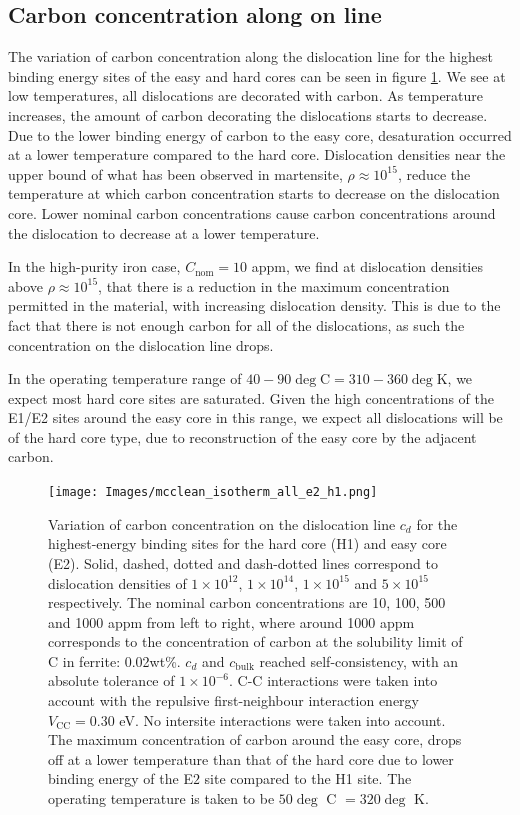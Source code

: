 \documentclass[a4paper,12pt,oneside,print,numbered,index,PageStyleIII]{PhDThesisPSnPDF}
\begin{document}
\subsection{Carbon concentration along on line}
\label{sec:org43adba5}

The variation of carbon concentration along the dislocation line for the highest
binding energy sites of the easy and hard cores can be seen in figure
\ref{cdhardeasy}. We see at low temperatures, all dislocations are
decorated with carbon. As temperature increases, the amount of carbon
decorating the dislocations starts to decrease. Due to the lower binding
energy of carbon to the easy core, desaturation occurred at a lower
temperature compared to the hard core. Dislocation densities near the upper
bound of what has been observed in martensite, \(\rho \approx10^{15}\), reduce
the temperature at which carbon concentration starts to decrease on the
dislocation core. Lower nominal carbon concentrations cause carbon
concentrations around the dislocation to decrease at a lower temperature.

In the high-purity iron case, \(C_{\text{nom}} = 10\) appm, we find at
dislocation densities above \(\rho \approx10^{15}\), that there is a reduction
in the maximum concentration permitted in the material, with increasing
dislocation density. This is due to the fact that there is not enough carbon
for all of the dislocations, as such the concentration on the dislocation line
drops.

In the operating temperature range of \(40-90\deg\text{C} = 310-360\deg\text{K}\), we expect most hard
core sites are saturated. Given the high concentrations of the E1/E2 sites around the easy core
in this range, we expect all dislocations will be of the hard core type, due to reconstruction of
the easy core by the adjacent carbon.

\begin{landscape}
 \begin{figure}
  \texttt{[image: Images/mcclean\_isotherm\_all\_e2\_h1.png]}
   \caption{Variation of carbon concentration on the dislocation line $c_d$ for the highest-energy binding sites for the hard core (H1) and easy core (E2). Solid, dashed, dotted and dash-dotted lines correspond to dislocation densities of $1\times10^{12}$, $1\times10^{14}$, $1\times10^{15}$ and $5\times10^{15}$ respectively. The nominal carbon concentrations are 10, 100, 500 and 1000 appm from left to right, where around 1000 appm corresponds to the concentration of carbon at the solubility limit of C in ferrite: 0.02wt\%. $c_d$ and $c_{\text{bulk}}$ reached self-consistency, with an absolute tolerance of $1\times 10^{-6}$. C-C interactions were taken into account with the repulsive first-neighbour interaction energy $V_{\text{CC}}=0.30$ eV. No intersite interactions were taken into account. The maximum concentration of carbon around the easy core, drops off at a lower temperature than that of the hard core due to lower binding energy of the E$2$ site compared to the H1 site. The operating temperature is taken to be $50\deg$ C $= 320 \deg$ K.}\label{cdhardeasy}
\end{figure}
\end{landscape}
\end{document}
